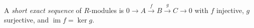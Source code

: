 
A \emph{short exact sequence} of $R$-modules is $0\to A\xrightarrow{f}B\xrightarrow{g}C\to0$ with $f$ injective, $g$ surjective, and $\operatorname{im}f=\ker g$.
